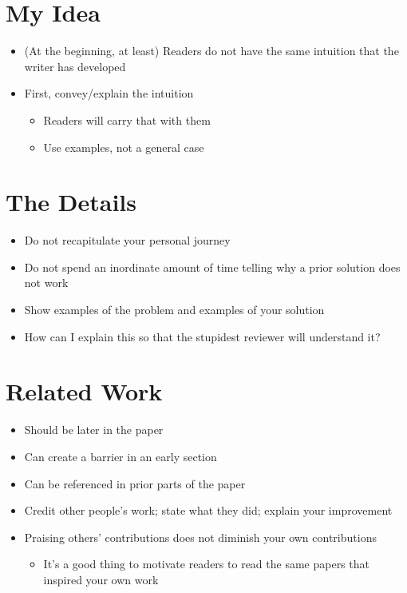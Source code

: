 \documentclass[11pt,a4paper]{article}
\begin{document}
\section{My Idea}

\begin{itemize}
\item (At the beginning, at least) Readers do not have the same intuition that the writer has developed
\item First, convey/explain the intuition
    \begin{itemize}
    \item Readers will carry that with them
    \item Use examples, not a general case
    \end{itemize}
\end{itemize}

\section{The Details}

\begin{itemize}
\item Do not recapitulate your personal journey
\item Do not spend an inordinate amount of time telling why a prior solution does not work
\item Show examples of the problem and examples of your solution
\item How can I explain this so that the stupidest reviewer will understand it?
\end{itemize}

\section{Related Work}

\begin{itemize}
\item Should be later in the paper
\item Can create a barrier in an early section
\item Can be referenced in prior parts of the paper
\item Credit other people's work; state what they did; explain your improvement
\item Praising others' contributions does not diminish your own contributions
    \begin{itemize}
    \item It's a good thing to motivate readers to read the same papers that inspired your own work
    \end{itemize}
\end{itemize}
\end{document}
